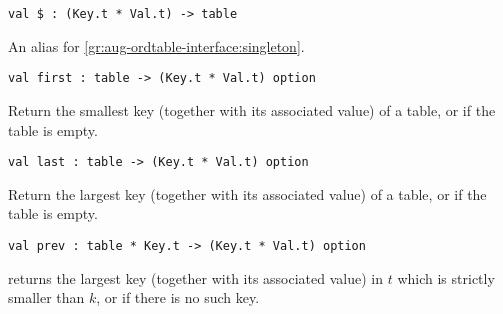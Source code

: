 \begin{cluster}
\label{grp:grm:aug-ordtable-interface::table}

\begin{gram}[\$]
\label{grm:aug-ordtable-interface::table}
\begin{verbatim}
val $ : (Key.t * Val.t) -> table
\end{verbatim}
An alias for \ref{gr:aug-ordtable-interface:singleton}.

\end{gram}
\end{cluster}

\begin{cluster}
\label{grp:grm:aug-ordtable-interface::first}

\begin{gram}[first]
\label{grm:aug-ordtable-interface::first}
\begin{verbatim}
val first : table -> (Key.t * Val.t) option
\end{verbatim}
Return the smallest key (together with its associated value) of a table, or
 if the table is empty.

\end{gram}
\end{cluster}

\begin{cluster}
\label{grp:grm:aug-ordtable-interface::last}

\begin{gram}[last]
\label{grm:aug-ordtable-interface::last}
\begin{verbatim}
val last : table -> (Key.t * Val.t) option
\end{verbatim}
Return the largest key (together with its associated value) of a table, or
 if the table is empty.

\end{gram}
\end{cluster}

\begin{cluster}
\label{grp:grm:aug-ordtable-interface::prev}

\begin{gram}[prev]
\label{grm:aug-ordtable-interface::prev}
\begin{verbatim}
val prev : table * Key.t -> (Key.t * Val.t) option
\end{verbatim}
 returns the largest key (together with its associated value)
in $t$
which is strictly smaller than $k$, or  if there is no such key.

\end{gram}
\end{cluster}

